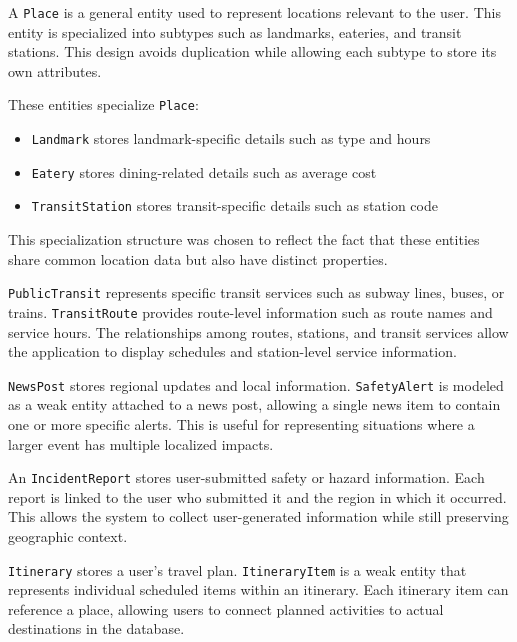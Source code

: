 
A \texttt{Place} is a general entity used to represent locations relevant to the user. This entity is specialized into subtypes such as landmarks, eateries, and transit stations. This design avoids duplication while allowing each subtype to store its own attributes.


These entities specialize \texttt{Place}:
\begin{itemize}
    \item \texttt{Landmark} stores landmark-specific details such as type and hours
    \item \texttt{Eatery} stores dining-related details such as average cost
    \item \texttt{TransitStation} stores transit-specific details such as station code
\end{itemize}

This specialization structure was chosen to reflect the fact that these entities share common location data but also have distinct properties.


\texttt{PublicTransit} represents specific transit services such as subway lines, buses, or trains. \texttt{TransitRoute} provides route-level information such as route names and service hours. The relationships among routes, stations, and transit services allow the application to display schedules and station-level service information.


\texttt{NewsPost} stores regional updates and local information. \texttt{SafetyAlert} is modeled as a weak entity attached to a news post, allowing a single news item to contain one or more specific alerts. This is useful for representing situations where a larger event has multiple localized impacts.


An \texttt{IncidentReport} stores user-submitted safety or hazard information. Each report is linked to the user who submitted it and the region in which it occurred. This allows the system to collect user-generated information while still preserving geographic context.


\texttt{Itinerary} stores a user's travel plan. \texttt{ItineraryItem} is a weak entity that represents individual scheduled items within an itinerary. Each itinerary item can reference a place, allowing users to connect planned activities to actual destinations in the database.

